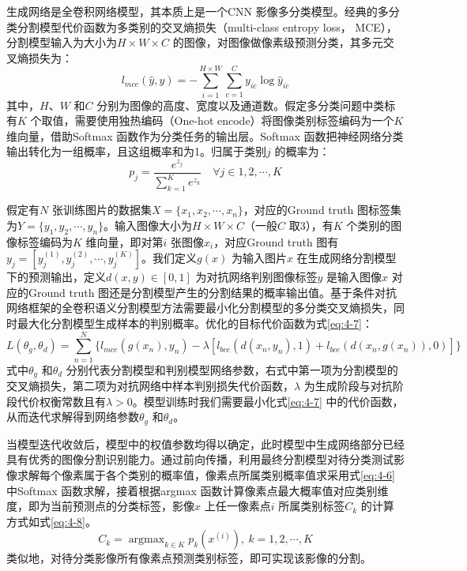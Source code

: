 生成网络是全卷积网络模型，其本质上是一个CNN 影像多分类模型。经典的多分类分割模型代价函数为多类别的交叉熵损失（multi-class entropy loss， MCE），分割模型输入为大小为$H\times W\times C$ 的图像，对图像做像素级预测分类，其多元交叉熵损失为：
\begin{equation}
  \label{eq:4-5}
  l_{mce} (\hat{y}, y) = -\sum_{i=1}^{H\times W}\sum_{c=1}^{C}y_{ic}\log\hat{y}_{ic}
\end{equation}
其中，$H$、$W$ 和$C$ 分别为图像的高度、宽度以及通道数。假定多分类问题中类标有$K$ 个取值，需要使用独热编码（One-hot encode）将图像类别标签编码为一个$K$ 维向量，借助Softmax 函数作为分类任务的输出层。Softmax 函数把神经网络分类输出转化为一组概率，且这组概率和为1。归属于类别$j$ 的概率为：
\begin{equation}
  \label{eq:4-6}
  p_j = \frac{e^{z_j}}{\sum_{k=1}^Ke^{z_k}}  \quad \forall j \in 1,2,\cdots, K
\end{equation}

假定有$N$ 张训练图片的数据集$X = \{x_1,x_2,\cdots, x_n \}$，对应的Ground truth 图标签集为$Y = \{y_1,y_2,\cdots, y_n \}$。输入图像大小为$H\times W\times C$（一般$C$ 取$3$），有$K$ 个类别的图像标签编码为$K$  维向量，即对第$i$ 张图像$x_i$，对应Ground truth 图有$y_j = [y_j^{(1)},y_j^{(2)}, \cdots, y_j^{(K)}]$。我们定义$g(x)$ 为输入图片$x$ 在生成网络分割模型下的预测输出，定义$d(x,y)\in [0,1]$ 为对抗网络判别图像标签$y$ 是输入图像$x$ 对应的Ground truth 图还是分割模型产生的分割结果的概率输出值。基于条件对抗网络框架的全卷积语义分割模型方法需要最小化分割模型的多分类交叉熵损失，同时最大化分割模型生成样本的判别概率。优化的目标代价函数为式\ref{eq:4-7}：
\begin{equation}
  \label{eq:4-7}
  L(\theta_g,\theta_d) = \sum_{n=1}^N \lbrace l_{mce} (g(x_n),y_n) - \lambda [l_{bce} (d(x_n,y_n),1) + l_{bce}(d(x_n,g(x_n)),0)] \rbrace
\end{equation}
式中$\theta_g$ 和$\theta_d$ 分别代表分割模型和判别模型网络参数，右式中第一项为分割模型的交叉熵损失，第二项为对抗网络中样本判别损失代价函数，$\lambda$ 为生成阶段与对抗阶段代价权衡常数且有$\lambda > 0$。模型训练时我们需要最小化式\ref{eq:4-7} 中的代价函数，从而迭代求解得到网络参数$\theta_g$ 和$\theta_d$。

当模型迭代收敛后，模型中的权值参数均得以确定，此时模型中生成网络部分已经具有优秀的图像分割识别能力。通过前向传播，利用最终分割模型对待分类测试影像求解每个像素属于各个类别的概率值，像素点所属类别概率值求采用式\ref{eq:4-6} 中Softmax 函数求解，接着根据argmax 函数计算像素点最大概率值对应类别维度，即为当前预测点的分类标签，影像$x$ 上任一像素点$i$ 所属类别标签$C_k$ 的计算方式如式\ref{eq:4-8}。
\begin{equation}
  \label{eq:4-8}
  C_k = \mathop{\arg\max}_{k \in K} p_k(x^{(i)}), \ k=1,2,\cdots,K
\end{equation}
类似地，对待分类影像所有像素点预测类别标签，即可实现该影像的分割。

